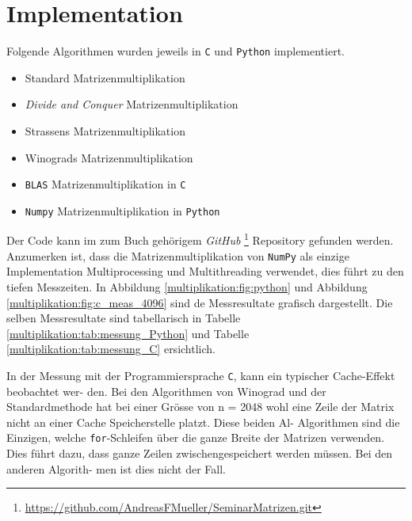 


\section{Implementation}\label{multiplikation:section:Implementation}

Folgende Algorithmen wurden jeweils in \texttt{C} und \texttt{Python} implementiert.
\begin{itemize}
	\item Standard Matrizenmultiplikation
	\item \textit{Divide and Conquer} Matrizenmultiplikation
	\item Strassens Matrizenmultiplikation
	\item Winograds Matrizenmultiplikation
	\item \texttt{BLAS} Matrizenmultiplikation in \texttt{C}
	\item \texttt{Numpy} Matrizenmultiplikation in \texttt{Python}
\end{itemize}

Der Code kann im zum Buch gehörigem \textit{GitHub} \footnote{\url{https://github.com/AndreasFMueller/SeminarMatrizen.git}} Repository gefunden werden.
Anzumerken ist, dass die Matrizenmultiplikation von \texttt{NumPy} als einzige Implementation Multiprocessing und Multithreading verwendet, dies f\"uhrt zu den tiefen Messzeiten.
In Abbildung \ref{multiplikation:fig:python} und Abbildung \ref{multiplikation:fig:c_meas_4096} sind de Messresultate grafisch dargestellt. Die selben Messresultate sind tabellarisch in Tabelle \ref{multiplikation:tab:messung_Python} und Tabelle \ref{multiplikation:tab:messung_C} ersichtlich.

In der Messung mit der Programmiersprache \texttt{C}, kann ein typischer Cache-Effekt beobachtet wer-
den. Bei den Algorithmen von Winograd und der Standardmethode hat bei einer Gr\"osse von
n = 2048 wohl eine Zeile der Matrix nicht an einer Cache Speicherstelle platzt. Diese beiden Al-
Algorithmen sind die Einzigen, welche \texttt{for}-Schleifen über die ganze Breite der Matrizen verwenden.
Dies führt dazu, dass ganze Zeilen zwischengespeichert werden müssen. Bei den anderen Algorith-
men ist dies nicht der Fall.

